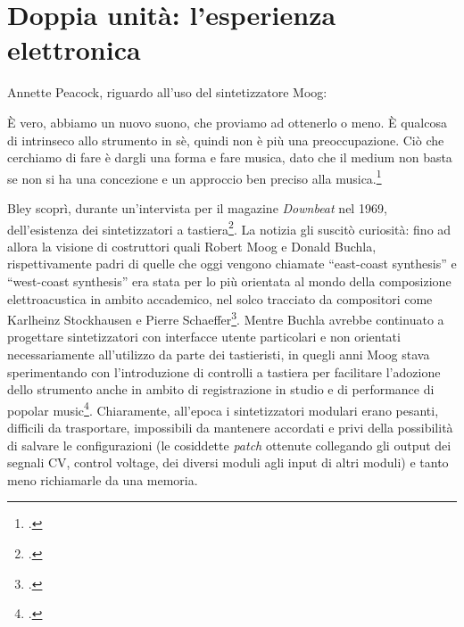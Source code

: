 \section{Doppia unità: l'esperienza elettronica}
Annette Peacock, riguardo all'uso del sintetizzatore Moog:
\begin{fquote}
	È vero, abbiamo un nuovo suono, che proviamo ad ottenerlo o meno. È qualcosa di intrinseco allo strumento in sè, quindi non è più una preoccupazione. Ciò che cerchiamo di fare è dargli una forma e fare musica, dato che il medium non basta se non si ha una concezione e un approccio ben preciso alla musica.\footcite[16]{fiofori}
\end{fquote}
Bley scoprì, durante un'intervista per il magazine \textit{Downbeat} nel 1969, dell'esistenza dei sintetizzatori a tastiera\footcite[108]{stopping}. La notizia gli suscitò curiosità: fino ad allora la visione di costruttori quali Robert Moog e Donald Buchla, rispettivamente padri di quelle che oggi vengono chiamate ``east-coast synthesis'' e ``west-coast synthesis'' era stata per lo più orientata al mondo della composizione elettroacustica in ambito accademico, nel solco tracciato da compositori come Karlheinz Stockhausen e Pierre Schaeffer\footcite[305]{gluck}. Mentre Buchla avrebbe continuato a progettare sintetizzatori con interfacce utente particolari e non orientati necessariamente all'utilizzo da parte dei tastieristi, in quegli anni Moog stava sperimentando con l'introduzione di controlli a tastiera per facilitare l'adozione dello strumento anche in ambito di registrazione in studio e di performance di popolar music\footcite[15]{fiofori}. Chiaramente, all'epoca i sintetizzatori modulari erano pesanti, difficili da trasportare, impossibili da mantenere accordati e privi della possibilità di salvare le configurazioni (le cosiddette \textit{patch} ottenute collegando gli output dei segnali CV, control voltage, dei diversi moduli agli input di altri moduli) e tanto meno richiamarle da una memoria. \par
